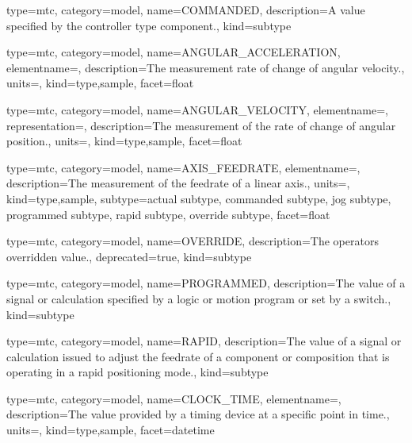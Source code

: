 {
  type=mtc,
  category=model,
  name={COMMANDED},
  description={A value specified by the \gls{controller} type component.},
  kind={subtype}
}


{
  type=mtc,
  category=model,
  name={ANGULAR\_ACCELERATION},
  elementname=,
  description={The measurement rate of change of angular velocity.},
  units=,
  kind={type,sample},
  facet={\gls{float}}
}


{
  type=mtc,
  category=model,
  name={ANGULAR\_VELOCITY},
  elementname=,
  representation=,
  description={The measurement of the rate of change of angular position.},
  units=,
  kind={type,sample},
  facet={\gls{float}}
}


{
  type=mtc,
  category=model,
  name={AXIS\_FEEDRATE},
  elementname=,
  description={The measurement of the feedrate of a linear axis.},
  units=,
  kind={type,sample},
  subtype={\gls{actual subtype}, \gls{commanded subtype}, \gls{jog subtype}, \gls{programmed subtype}, \gls{rapid subtype}, \gls{override subtype}},
  facet={\gls{float}}
}



{
  type=mtc,
  category=model,
  name={OVERRIDE},
  description={The operators overridden value.},
  deprecated={true},
  kind={subtype}
}


{
  type=mtc,
  category=model,
  name={PROGRAMMED},
  description={The value of a signal or calculation specified by a logic or motion program or set by a switch.},
  kind={subtype}
}


{
  type=mtc,
  category=model,
  name={RAPID},
  description={The value of a signal or calculation issued to adjust the feedrate of a component or composition that is operating in a rapid positioning mode.},
  kind={subtype}
}


{
  type=mtc,
  category=model,
  name={CLOCK\_TIME},
  elementname=,
  description={The value provided by a timing device at a specific point in time.},
  units=,
  kind={type,sample},
  facet={\gls{datetime}}
}


